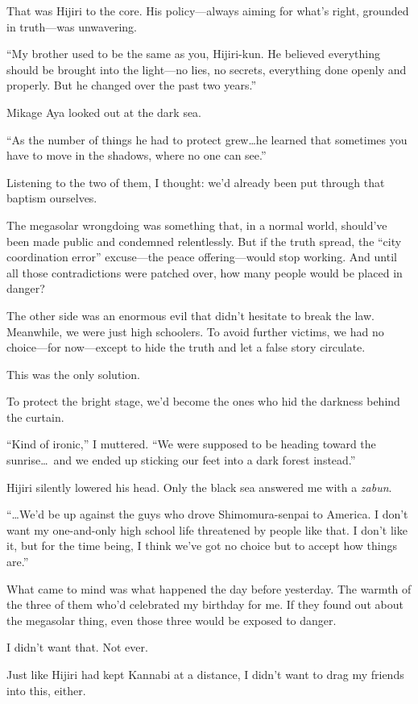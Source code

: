 \documentclass[
    a4paper,
    12pt,
    twoside,
    openany,
    UTF8,
    fontset=windows
]{ctexbook}
\begin{document}
That was Hijiri to the core. His policy---always aiming for what's right, grounded in truth---was unwavering.

``My brother used to be the same as you, Hijiri-kun. He believed everything should be brought into the light---no lies, no secrets, everything done openly and properly. But he changed over the past two years.''

Mikage Aya looked out at the dark sea.

``As the number of things he had to protect grew\dots he learned that sometimes you have to move in the shadows, where no one can see.''

Listening to the two of them, I thought: we'd already been put through that baptism ourselves.

The megasolar wrongdoing was something that, in a normal world, should've been made public and condemned relentlessly. But if the truth spread, the ``city coordination error'' excuse---the peace offering---would stop working. And until all those contradictions were patched over, how many people would be placed in danger?

The other side was an enormous evil that didn't hesitate to break the law. Meanwhile, we were just high schoolers. To avoid further victims, we had no choice---for now---except to hide the truth and let a false story circulate.

This was the only solution.

To protect the bright stage, we'd become the ones who hid the darkness behind the curtain.

``Kind of ironic,'' I muttered. ``We were supposed to be heading toward the sunrise\dots\ and we ended up sticking our feet into a dark forest instead.''

Hijiri silently lowered his head. Only the black sea answered me with a \textit{zabun}.

``\dots We'd be up against the guys who drove Shimomura-senpai to America. I don't want my one-and-only high school life threatened by people like that. I don't like it, but for the time being, I think we've got no choice but to accept how things are.''

What came to mind was what happened the day before yesterday. The warmth of the three of them who'd celebrated my birthday for me. If they found out about the megasolar thing, even those three would be exposed to danger.

I didn't want that. Not ever.

Just like Hijiri had kept Kannabi at a distance, I didn't want to drag my friends into this, either.
\end{document}
